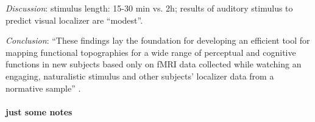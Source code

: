 %
\textit{Discussion}: stimulus length: 15-30 min vs. 2h;  results of auditory
stimulus to predict visual localizer are ``modest''.

%
\textit{Conclusion}: ``These findings lay the foundation for developing an
efficient tool for mapping functional topographies for a wide range of
perceptual and cognitive functions in new subjects based only on fMRI data
collected while watching an engaging, naturalistic stimulus and other subjects'
localizer data from a normative sample'' \citep{jiahui2020predicting}.


\paragraph{just some notes}

